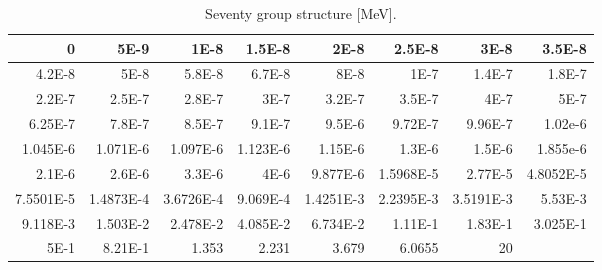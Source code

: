 \begin{appendices}
\begin{table}[h!]
  \centering
  \footnotesize
  \caption{Seventy group structure [MeV].}
  \label{table:app-70-groups} 
  \vspace{14pt}
  \begin{tabular}{r|r|r|r|r|r|r|r}
  \toprule
  0 & 5E-9 & 1E-8 & 1.5E-8 & 2E-8 & 2.5E-8 & 3E-8 & 3.5E-8 \\
  \midrule
  4.2E-8 & 5E-8 & 5.8E-8 & 6.7E-8 & 8E-8 & 1E-7 & 1.4E-7 & 1.8E-7 \\
  \midrule
  2.2E-7 & 2.5E-7 & 2.8E-7 & 3E-7 & 3.2E-7 & 3.5E-7 & 4E-7 & 5E-7 \\
  \midrule
  6.25E-7 & 7.8E-7 & 8.5E-7 & 9.1E-7 & 9.5E-6 & 9.72E-7 & 9.96E-7 & 1.02e-6 \\
  \midrule
  1.045E-6 & 1.071E-6 & 1.097E-6 & 1.123E-6 & 1.15E-6 & 1.3E-6 & 1.5E-6 & 1.855e-6 \\
  \midrule
  2.1E-6 & 2.6E-6 & 3.3E-6 & 4E-6 & 9.877E-6 & 1.5968E-5 & 2.77E-5 & 4.8052E-5 \\
  \midrule
  7.5501E-5 & 1.4873E-4 & 3.6726E-4 & 9.069E-4 & 1.4251E-3 & 2.2395E-3 & 3.5191E-3 & 5.53E-3 \\
  \midrule
  9.118E-3 & 1.503E-2 & 2.478E-2 & 4.085E-2 & 6.734E-2 & 1.11E-1 & 1.83E-1 & 3.025E-1 \\
  \midrule
   5E-1 & 8.21E-1 & 1.353 & 2.231 & 3.679 & 6.0655 & 20 \\
  \bottomrule
 \end{tabular}
\end{table}


\end{appendices}
